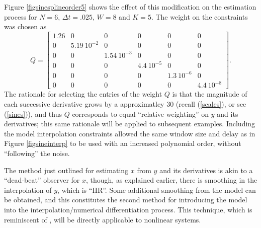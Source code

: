 Figure \ref{figsinesplineorder5} shows the
effect of this modification on the estimation process for $N=6$, $\Delta t = .025$, 
$W=8$ and $K=5$.  The weight on the constraints was chosen as 
\begin{equation} Q = 
\left[ \begin{array}{cccccc} 1.26 & 0 & 0 & 0 & 0 & 0\\
0  & 5.19 \ 10^{-2}  & 0 & 0 & 0 & 0 \\
0 & 0 & 1.54 \ 10^{-3} & 0 & 0 & 0 \\
0 & 0 & 0 & 4.4 \ 10^{-5} & 0 & 0 \\
0 & 0 & 0 & 0 & 1.3 \ 10^{-6} & 0 \\
0 & 0 & 0 & 0 & 0 & 4.4 \ 10^{-8}
\end{array} \right].
\end{equation}
The rationale for
selecting the entries of the
weight $Q$ is that the magnitude of each successive derivative grows by a
approximatley
30 (recall (\ref{scales}), or see (\ref{sines})), 
and thus $Q$ corresponds to equal ``relative
weighting'' on $y$ and its derivatives;
this same rationale will be applied to subsequent examples. Including the model
interpolation constraints allowed the same window size and delay as in Figure
\ref{figsineinterp} to be used with an increased polynomial order, without
``following'' the noise.


The method just outlined for estimating $x$ from $y$ and its derivatives is akin to
a ``dead-beat'' observer for $x$, though, as explained
earlier, there is smoothing in the
interpolation of $y$, which is ``IIR''.  Some additional smoothing from the
model can be obtained, and this constitutes the second method for introducing
the model into the interpolation/numerical differentiation process.
This technique, which is reminiscent of
\cite{grizzle1990b,grizzle1990a,grizzle1990c,moraal1992}, 
will be
directly applicable to nonlinear systems.  

